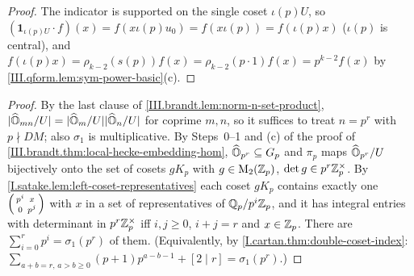 \begin{lemma}
\end{lemma}
\begin{proof}
The indicator is supported on the single coset $\iota(p)U$, so $(\mathbf 1_{\iota(p)U}\cdot f)(x)=f(x\iota(p)u_0)=f(x\iota(p))=f(\iota(p)x)$ ($\iota(p)$ is
central), and $f(\iota(p)x)=\rho_{k-2}(s(p))f(x)=\rho_{k-2}(p\cdot1)f(x)=p^{k-2}f(x)$ by \cref{III.qform.lem:sym-power-basic}(c).
\end{proof}

\begin{theorem}
\end{theorem}
\begin{proof}
By the last clause of \cref{III.brandt.lem:norm-n-set-product}, $\lvert\widehat{\mathbb{O}}_{mn}/U\rvert=\lvert\widehat{\mathbb{O}}_m/U\rvert\lvert\widehat{\mathbb{O}}_n/U\rvert$ for coprime $m,n$, so it suffices to treat $n=p^r$ with
$p\nmid DM$; also $\sigma_1$ is multiplicative. By Steps~0--1 and (c) of the proof of \cref{III.brandt.thm:local-hecke-embedding-hom}, $\widehat{\mathbb{O}}_{p^r}\subseteq G_p$
and $\pi_p$ maps $\widehat{\mathbb{O}}_{p^r}/U$ bijectively onto the set of cosets $gK_p$ with $g\in\mathrm{M}_2(\mathbb{Z}_p)$, $\det g\in p^r\mathbb{Z}_p^\times$. By
\cref{I.satake.lem:left-coset-representatives} each coset $gK_p$ contains exactly one $\begin{psmallmatrix}p^i&x\\0&p^j\end{psmallmatrix}$ with $x$ in a set of
representatives of $\mathbb{Q}_p/p^i\mathbb{Z}_p$, and it has integral entries with determinant in $p^r\mathbb{Z}_p^\times$ iff $i,j\ge0$, $i+j=r$ and $x\in\mathbb{Z}_p$. There are
$\sum_{i=0}^rp^i=\sigma_1(p^r)$ of them. (Equivalently, by \cref{I.cartan.thm:double-coset-index}:
$\sum_{a+b=r,\,a>b\ge0}(p+1)p^{a-b-1}+[2\mid r]=\sigma_1(p^r)$.)
\end{proof}

